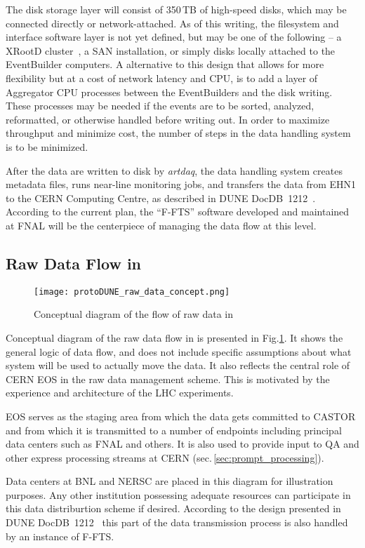 The disk storage layer will consist of 350\,TB of high-speed
disks, which may be connected directly or network-attached.  As of this writing, the filesystem and
interface software layer is not yet defined, but may be one of the
following --
a XRootD cluster~\cite{xrootd}, a SAN installation, or
simply disks locally attached to the EventBuilder computers.  A
alternative to this design that allows for more flexibility but at a
cost of network latency and CPU, is to add a layer of Aggregator CPU
processes between the EventBuilders and the disk writing.  These
processes may be needed if the events are to be sorted, analyzed,
reformatted, or otherwise handled before writing out.  In order to
maximize throughput and minimize cost, the number of steps in the data
handling system is to be minimized.

After the data are written to disk by {\it artdaq}, the data handling
system creates metadata files, runs near-line monitoring jobs, and
transfers the data from EHN1 to the CERN Computing Centre, as
described in DUNE DocDB~1212~\cite{docdb1212}. According to the current plan,
the ``F-FTS'' software developed and maintained at FNAL will be the centerpiece
of managing the data flow at this level.


\subsection{Raw Data Flow in \pd}
\label{sec:raw_concept}
\begin{figure}[tbh]
\centering\texttt{[image: protoDUNE\_raw\_data\_concept.png]}
\caption{\label{fig:raw_concept}Conceptual diagram of the flow of raw data in \pd}
\end{figure}

\noindent
Conceptual diagram of the raw data flow in \pd is presented in Fig.\ref{fig:raw_concept}. It shows the general logic
of data flow, and does not include specific assumptions about what system will be used to actually move the data.
It also reflects the central role of CERN EOS in the \pd raw data management scheme. This is motivated by the experience
and architecture of the LHC experiments.

EOS serves as the staging area from which the data gets committed to CASTOR
and from which it is transmitted to a number of endpoints including principal data centers such as FNAL and others.
It is also used to provide input to QA and other express processing streams at CERN (sec.\,\ref{sec:prompt_processing}).

Data centers at BNL and NERSC are placed in this diagram for illustration purposes. Any other institution possessing adequate
resources can participate in this data distriburtion scheme if desired. According to the design presented in DUNE DocDB~1212~\cite{docdb1212}
this part of the data transmission process is also handled by an instance of F-FTS.


